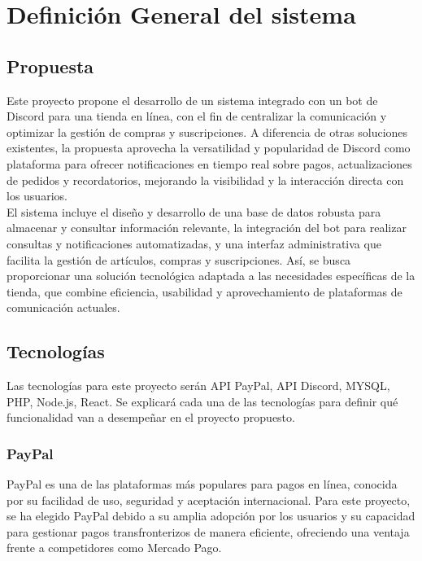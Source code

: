 \documentclass[a4paper,12pt]{article}
\begin{document}
\newpage


\section{Definición General del sistema}
\subsection{Propuesta}
Este proyecto propone el desarrollo de un sistema integrado con un bot de Discord para una tienda en línea, con el fin de centralizar la comunicación y optimizar la gestión de compras y suscripciones. A diferencia de otras soluciones existentes, la propuesta aprovecha la versatilidad y popularidad de Discord como plataforma para ofrecer notificaciones en tiempo real sobre pagos, actualizaciones de pedidos y recordatorios, mejorando la visibilidad y la interacción directa con los usuarios.\\

El sistema incluye el diseño y desarrollo de una base de datos robusta para almacenar y consultar información relevante, la integración del bot para realizar consultas y notificaciones automatizadas, y una interfaz administrativa que facilita la gestión de artículos, compras y suscripciones. Así, se busca proporcionar una solución tecnológica adaptada a las necesidades específicas de la tienda, que combine eficiencia, usabilidad y aprovechamiento de plataformas de comunicación actuales.
\newpage
\subsection{Tecnologías}

Las tecnologías para este proyecto serán API PayPal, API Discord, 
 MYSQL, PHP, Node.js, React. Se explicará cada una de las tecnologías para definir qué funcionalidad van a desempeñar en el proyecto propuesto.
\subsubsection{PayPal}

PayPal es una de las plataformas más populares para pagos en línea, conocida por su facilidad de uso, seguridad y aceptación internacional. Para este proyecto, se ha elegido PayPal debido a su amplia adopción por los usuarios y su capacidad para gestionar pagos transfronterizos de manera eficiente, ofreciendo una ventaja frente a competidores como Mercado Pago.\\
\end{document}
